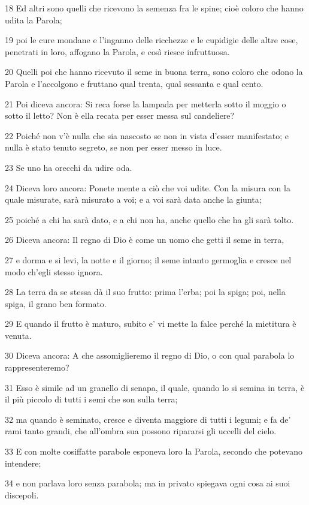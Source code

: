 \par 18 Ed altri sono quelli che ricevono la semenza fra le spine; cioè coloro che hanno udita la Parola;
\par 19 poi le cure mondane e l'inganno delle ricchezze e le cupidigie delle altre cose, penetrati in loro, affogano la Parola, e così riesce infruttuosa.
\par 20 Quelli poi che hanno ricevuto il seme in buona terra, sono coloro che odono la Parola e l'accolgono e fruttano qual trenta, qual sessanta e qual cento.
\par 21 Poi diceva ancora: Si reca forse la lampada per metterla sotto il moggio o sotto il letto? Non è ella recata per esser messa sul candeliere?
\par 22 Poiché non v'è nulla che sia nascosto se non in vista d'esser manifestato; e nulla è stato tenuto segreto, se non per esser messo in luce.
\par 23 Se uno ha orecchi da udire oda.
\par 24 Diceva loro ancora: Ponete mente a ciò che voi udite. Con la misura con la quale misurate, sarà misurato a voi; e a voi sarà data anche la giunta;
\par 25 poiché a chi ha sarà dato, e a chi non ha, anche quello che ha gli sarà tolto.
\par 26 Diceva ancora: Il regno di Dio è come un uomo che getti il seme in terra,
\par 27 e dorma e si levi, la notte e il giorno; il seme intanto germoglia e cresce nel modo ch'egli stesso ignora.
\par 28 La terra da se stessa dà il suo frutto: prima l'erba; poi la spiga; poi, nella spiga, il grano ben formato.
\par 29 E quando il frutto è maturo, subito e' vi mette la falce perché la mietitura è venuta.
\par 30 Diceva ancora: A che assomiglieremo il regno di Dio, o con qual parabola lo rappresenteremo?
\par 31 Esso è simile ad un granello di senapa, il quale, quando lo si semina in terra, è il più piccolo di tutti i semi che son sulla terra;
\par 32 ma quando è seminato, cresce e diventa maggiore di tutti i legumi; e fa de' rami tanto grandi, che all'ombra sua possono ripararsi gli uccelli del cielo.
\par 33 E con molte cosiffatte parabole esponeva loro la Parola, secondo che potevano intendere;
\par 34 e non parlava loro senza parabola; ma in privato spiegava ogni cosa ai suoi discepoli.
